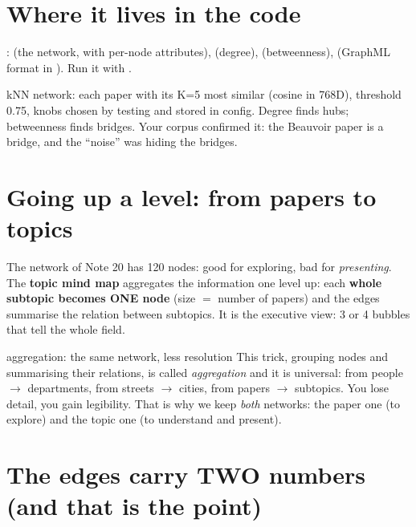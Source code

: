 \documentclass[11pt,a4paper]{article}
\begin{document}
\section{Where it lives in the code}

:  (the network, with per-node
attributes),  (degree),  (betweenness),
 (GraphML format in ).
Run it with .

\begin{resumen}
kNN network: each paper with its K=5 most similar (cosine in 768D), threshold 0.75, knobs
chosen by testing and stored in config. Degree finds hubs; betweenness finds bridges. Your
corpus confirmed it: the Beauvoir paper is a bridge, and the ``noise'' was hiding the bridges.
\end{resumen}
\clearpage
{}
{}

\section{Going up a level: from papers to topics}

The network of Note 20 has 120 nodes: good for exploring, bad for \emph{presenting}. The
\textbf{topic mind map} aggregates the information one level up: each \textbf{whole subtopic
becomes ONE node} (size $=$ number of papers) and the edges summarise the relation between
subtopics. It is the executive view: 3 or 4 bubbles that tell the whole field.

\begin{concepto}{aggregation: the same network, less resolution}
This trick, grouping nodes and summarising their relations, is called \emph{aggregation} and
it is universal: from people $\rightarrow$ departments, from streets $\rightarrow$ cities, from
papers $\rightarrow$ subtopics. You lose detail, you gain legibility. That is why we keep
\emph{both} networks: the paper one (to explore) and the topic one (to understand and
present).
\end{concepto}

\section{The edges carry TWO numbers (and that is the point)}
\end{document}
